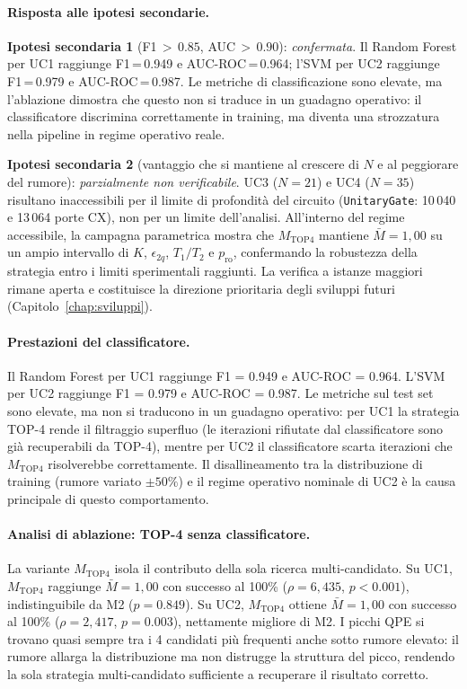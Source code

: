 \begin{onehalfspace}
\paragraph{Risposta alle ipotesi secondarie.}
\textbf{Ipotesi secondaria 1} (F1\,$>\,0.85$, AUC\,$>\,0.90$): \emph{confermata}. Il Random Forest per UC1 raggiunge F1\,=\,0.949 e AUC-ROC\,=\,0.964; l'SVM per UC2 raggiunge F1\,=\,0.979 e AUC-ROC\,=\,0.987. Le metriche di classificazione sono elevate, ma l'ablazione dimostra che questo non si traduce in un guadagno operativo: il classificatore discrimina correttamente in training, ma diventa una strozzatura nella pipeline in regime operativo reale.

\textbf{Ipotesi secondaria 2} (vantaggio che si mantiene al crescere di $N$ e al peggiorare del rumore): \emph{parzialmente non verificabile}. UC3 ($N=21$) e UC4 ($N=35$) risultano inaccessibili per il limite di profondità del circuito (\texttt{UnitaryGate}: 10\,040 e 13\,064 porte CX), non per un limite dell'analisi. All'interno del regime accessibile, la campagna parametrica mostra che $M_{\text{TOP4}}$ mantiene $\bar{M}=1{,}00$ su un ampio intervallo di $K$, $\epsilon_{2q}$, $T_1/T_2$ e $p_{\text{ro}}$, confermando la robustezza della strategia entro i limiti sperimentali raggiunti. La verifica a istanze maggiori rimane aperta e costituisce la direzione prioritaria degli sviluppi futuri (Capitolo~\ref{chap:sviluppi}).

\paragraph{Prestazioni del classificatore.}
Il Random Forest per UC1 raggiunge F1 = 0.949 e \ac{AUC}-ROC = 0.964. L'\ac{SVM} per UC2 raggiunge F1 = 0.979 e \ac{AUC}-ROC = 0.987. Le metriche sul test set sono elevate, ma non si traducono in un guadagno operativo: per UC1 la strategia TOP-4 rende il filtraggio superfluo (le iterazioni rifiutate dal classificatore sono già recuperabili da TOP-4), mentre per UC2 il classificatore scarta iterazioni che $M_{\text{TOP4}}$ risolverebbe correttamente. Il disallineamento tra la distribuzione di training (rumore variato $\pm50\%$) e il regime operativo nominale di UC2 è la causa principale di questo comportamento.

\paragraph{Analisi di ablazione: TOP-4 senza classificatore.}
La variante $M_{\text{TOP4}}$ isola il contributo della sola ricerca multi-candidato. Su UC1, $M_{\text{TOP4}}$ raggiunge $\bar{M} = 1{,}00$ con successo al 100\% ($\rho = 6{,}435$, $p < 0.001$), indistinguibile da M2 ($p = 0.849$). Su UC2, $M_{\text{TOP4}}$ ottiene $\bar{M} = 1{,}00$ con successo al 100\% ($\rho = 2{,}417$, $p = 0.003$), nettamente migliore di M2. I picchi QPE si trovano quasi sempre tra i 4 candidati più frequenti anche sotto rumore elevato: il rumore allarga la distribuzione ma non distrugge la struttura del picco, rendendo la sola strategia multi-candidato sufficiente a recuperare il risultato corretto.


\end{onehalfspace}
